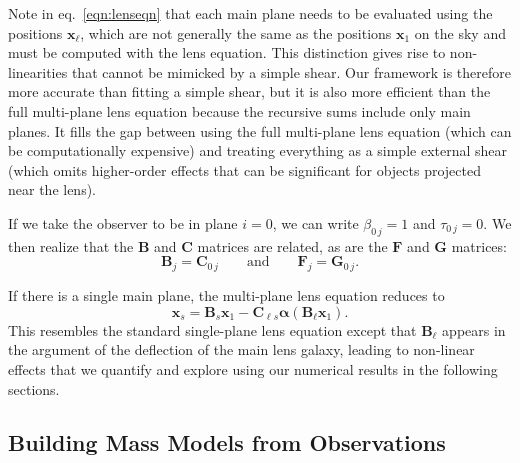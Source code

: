 \documentclass{emulateapj}
\newcommand\B[0]{\mathbf{B}}
\newcommand\C[0]{\mathbf{C}}
\newcommand\F[0]{\mathbf{F}}
\newcommand\G[0]{\mathbf{G}}
\newcommand\x[0]{\mathbf{x}}
\newcommand\al[0]{\boldsymbol{\alpha}}
\begin{document}
Note in eq.\ \ref{eqn:lenseqn} that each main plane needs to be evaluated using the positions $\x_\ell$, which are not generally the same as the positions $\x_1$ on the sky and must be computed with the lens equation. This distinction gives rise to non-linearities that cannot be mimicked by a simple shear. Our framework is therefore more accurate than fitting a simple shear, but it is also more efficient than the full multi-plane lens equation because the recursive sums include only main planes.  It fills the gap between using the full multi-plane lens equation (which can be computationally expensive) and treating everything as a simple external shear (which omits higher-order effects that can be significant for objects projected near the lens).

If we take the observer to be in plane $i =0$, we can write $\beta_{0\,j} = 1$ and $\tau_{0\,j} = 0$. We then realize that the $\B$ and $\C$ matrices are related, as are the $\F$ and $\G$ matrices:
\begin{equation}\label{eqn:BC-FG}
\B_j = \C_{0 \, j}
\qquad\mbox{and}\qquad
\F_{j} = \G_{0 \, j}.
\end{equation}

If there is a single main plane, the multi-plane lens equation reduces to
\begin{equation}
\x_s = \B_s \x_1 - \C_{\ell s} \al(\B_\ell \x_1).
\end{equation}
This resembles the standard single-plane lens equation except that $\B_\ell$ appears in the argument of the deflection of the main lens galaxy, leading to non-linear effects that we quantify and explore using our numerical results in the following sections.


\subsection{Building Mass Models from Observations \label{sec:massmodels}}
\end{document}
